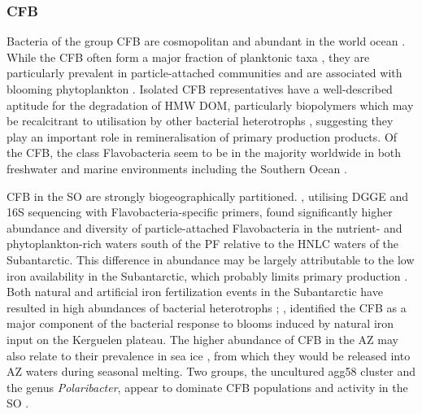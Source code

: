 \subsubsection{CFB}

Bacteria of the group \ac{CFB} are cosmopolitan and abundant in the world ocean \cite{Glockner:1999vm}.
While the \ac{CFB} often form a major fraction of planktonic taxa \cite{Fandino:2001uw}, they are particularly prevalent in particle-attached communities \cite{DeLong:1993uu} and are associated with blooming phytoplankton \cite{Pinhassi:2004is}.
Isolated \ac{CFB} representatives have a well-described aptitude for the degradation of \ac{HMW} \ac{DOM}, particularly biopolymers which may be recalcitrant to utilisation by other bacterial heterotrophs \citep[reviewed in][]{Kirchman:2002ub}, suggesting they play an important role in remineralisation of primary production products.
Of the \ac{CFB}, the class Flavobacteria seem to be in the majority worldwide in both freshwater and marine environments \cite{OSullivan:2006km,Cottrell:2005bo} including the Southern Ocean \cite{Abell:2005ji}.

\ac{CFB} in the \ac{SO} are strongly biogeographically partitioned.
\citet{Abell:2005ji}, utilising \ac{DGGE} and 16S sequencing with Flavobacteria-specific primers, found significantly higher abundance and diversity of particle-attached Flavobacteria in the nutrient- and phytoplankton-rich waters south of the \ac{PF} relative to the \ac{HNLC} waters of the Subantarctic.
This difference in abundance may be largely attributable to the low iron availability in the Subantarctic, which probably limits primary production \cite{Boyd:2007ij}.
Both natural and artificial iron fertilization events in the Subantarctic have resulted in high abundances of bacterial heterotrophs \cite{Christaki:2008el,Oliver:2004ty}; \citet{West:2008kc}, identified the \ac{CFB} as a major component of the bacterial response to blooms induced by natural iron input on the Kerguelen plateau.
The higher abundance of \ac{CFB} in the \ac{AZ} may also relate to their prevalence in sea ice \cite{Brinkmeyer:2003iq,Brown:2001hh}, from which they would be released into \ac{AZ} waters during seasonal melting.
Two groups, the uncultured agg58 cluster and the genus \emph{Polaribacter}, appear to dominate \ac{CFB} populations and activity in the \ac{SO} \cite{Murray:2007db,Abell:2005ji,Abell:dh,Obernosterer:2011df,West:2008kc,Ghiglione:2011ee,Ducklow:2011jl,Straza:2010io}.

